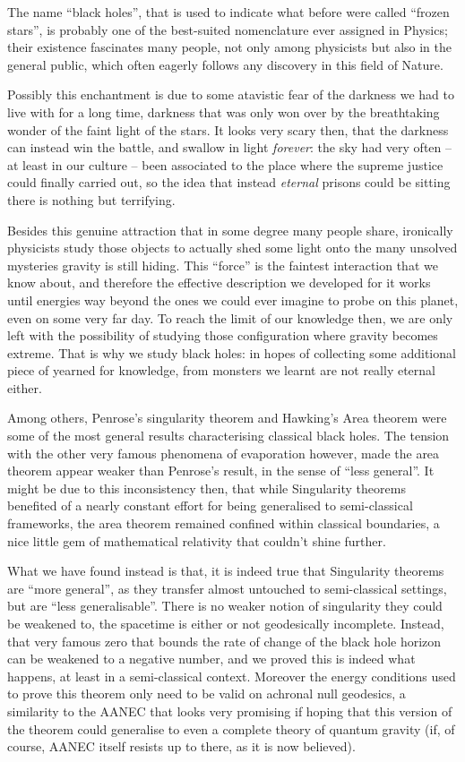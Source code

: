The name ``black holes'', that is used to indicate what before were called ``frozen stars'', is probably one of the best-suited nomenclature ever assigned in Physics; their existence fascinates many people, not only among physicists but also in the general public, which often eagerly follows any discovery in this field of Nature.

Possibly this enchantment is due to some atavistic fear of the darkness we had to live with for a long time, darkness that was only won over by the breathtaking wonder of the faint light of the stars. It looks very scary then, that the darkness can instead win the battle, and swallow in light \emph{forever}: the sky had very often -- at least in our culture -- been associated to the place where the supreme justice could finally carried out, so the idea that instead \emph{eternal} prisons could be sitting there is nothing but terrifying.  
	
Besides this genuine attraction that in some degree many people share, ironically physicists study those objects to actually shed some light onto the many unsolved mysteries gravity is still hiding.
This ``force'' is the faintest interaction that we know about, and therefore the effective description we developed for it works until energies way beyond the ones we could ever imagine to probe on this planet, even on some very far day. To reach the limit of our knowledge then, we are only left with the possibility of studying those configuration where gravity becomes extreme. That is why we study black holes: in hopes of collecting some additional piece of yearned for knowledge, from monsters we learnt are not really eternal either. 

Among others, Penrose's singularity theorem and Hawking's Area theorem were some of the most general results characterising classical black holes. The tension with the other very famous phenomena of evaporation however, made the area theorem appear weaker than Penrose's result, in the sense of ``less general''. It might be due to this inconsistency then, that while Singularity theorems benefited of a nearly constant effort for being generalised to semi-classical frameworks, the area theorem remained confined within classical boundaries, a nice little gem of mathematical relativity that couldn't shine further.

What we have found instead is that, it is indeed true that Singularity theorems are ``more general'', as they transfer almost untouched to semi-classical settings, but are ``less generalisable''. There is no weaker notion of singularity they could be weakened to, the spacetime is either or not geodesically incomplete. Instead, that very famous zero that bounds the rate of change of the black hole horizon can be weakened to a negative number, and we proved this is indeed what happens, at least in a semi-classical context. 
Moreover the energy conditions used to prove this theorem only need to be valid on achronal null geodesics, a similarity to the AANEC that looks very promising if hoping that this version of the theorem could generalise to even a complete theory of quantum gravity (if, of course, AANEC itself resists up to there, as it is now believed).

